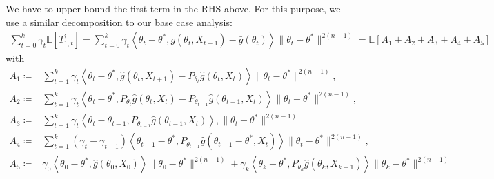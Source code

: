 \documentclass[a4paper]{article}
\newcommand{\norm}[1]{\|#1 \|}
\newcommand{\Exs}{\mathbb{E}}
\newcommand{\thetastar}{\theta^*}
\newcommand{\constTprime}[1]{T_{#1}^{\prime}}
\begin{document}
	We have to upper bound the first term in the RHS above. For this purpose, we use a similar decomposition to our base case analysis:
	\begin{align*}
		\sum_{t = 0}^{k}\gamma_{t}\Exs\left[\constTprime{1, t}\right] = \sum_{t = 0}^{k}\gamma_{t}\left\langle \theta_{t} - \thetastar, g\left(\theta_{t}, X_{t + 1}\right) - \bar{g}\left(\theta_{t}\right)\right\rangle\norm{\theta_{t} - \thetastar}^{2(n - 1)} = \Exs\left[ A_{1} + A_{2} + A_{3} + A_{4} + A_{5}\right]
	\end{align*} 
	with
	\begin{align*}
		A_{1} \coloneq & \sum_{t = 1}^{k}\gamma_{t}\left\langle \theta_{t} - \thetastar, \hat{g}\left(\theta_{t}, X_{t + 1}\right) - P_{\theta_{t}}\hat{g}\left(\theta_{t}, X_{t}\right) \right\rangle\norm{\theta_{t} - \thetastar}^{2(n - 1)},\\
		A_{2} \coloneq & \sum_{t = 1}^{k}\gamma_{t}\left\langle \theta_{t} - \thetastar, P_{\theta_{t}}\hat{g}\left(\theta_{t}, X_{t}\right) - P_{\theta_{t - 1}}\hat{g}\left( \theta_{t - 1}, X_{t} \right) \right\rangle\norm{\theta_{t} - \thetastar}^{2(n - 1)},\\
		A_{3} \coloneq & \sum_{t = 1}^{k}\gamma_{t}\left\langle \theta_{t} - \theta_{t - 1}, P_{\theta_{t - 1}}\hat{g}\left( \theta_{t - 1}, X_{t}\right) \right\rangle,\norm{\theta_{t} - \thetastar}^{2(n - 1)}\\
		A_{4} \coloneq & \sum_{t = 1}^{k}\left(\gamma_{t} - \gamma_{t - 1}\right)\left\langle \theta_{t - 1} - \thetastar, P_{\theta_{t - 1}}\hat{g}\left( \theta_{t - 1} - \thetastar, X_{t}\right) \right\rangle\norm{\theta_{t} - \thetastar}^{2(n - 1)},\\
		A_{5} \coloneq & \gamma_{0}\left\langle \theta_{0} - \thetastar, \hat{g}\left(\theta_{0}, X_{0}\right) \right\rangle\norm{\theta_{0} - \thetastar}^{2(n - 1)} + \gamma_{k}\left\langle \theta_{k} - \thetastar, P_{\theta_{k}}\hat{g}\left(\theta_{k}, X_{k + 1}\right)\right\rangle\norm{\theta_{k} - \thetastar}^{2(n - 1)}
	\end{align*}
	
	
	
	
\end{document}
